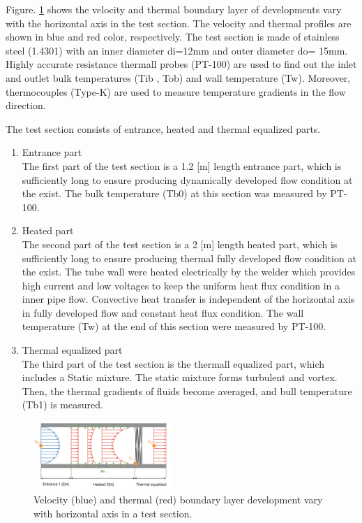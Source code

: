 \documentclass[conference]{IEEEtran}
\begin{document}
Figure. \ref{thermal_boundary_layer_development} shows the velocity and thermal boundary layer of developments vary with the horizontal axis in the test section.
The velocity and thermal profiles are shown in blue and red color, respectively.
The test section is made of stainless steel (1.4301) with an inner diameter di=12mm and outer diameter do= 15mm.
Highly accurate resistance thermall probes (PT-100) are used to find out the inlet and outlet bulk temperatures (Tib , Tob) and wall temperature (Tw).
Moreover, thermocouples (Type-K) are used to measure temperature gradients in the flow direction.

The test section consists of entrance, heated and thermal equalized parts.
\begin{enumerate}
  \item Entrance part\\
  The first part of the test section is a 1.2 [m] length entrance part, which is sufficiently long to ensure producing dynamically developed flow condition at the exist.
  The bulk temperature (Tb0) at this section was measured by PT-100.
  \item Heated part\\
  The second part of the test section is a 2 [m] length heated part, which is sufficiently long to ensure producing thermal fully developed flow condition at the exist.
  The tube wall were heated electrically by the welder which provides high current and low voltages to keep the uniform heat flux condition in a inner pipe flow.
  Convective heat transfer is independent of the horizontal axis in fully developed flow and constant heat flux condition.
  The wall temperature (Tw) at the end of this section were measured by PT-100.
  \item Thermal equalized part\\
  The third part of the test section is the thermall equalized part, which includes a Static mixture.
  The static mixture forms turbulent and vortex.
  Then, the thermal gradients of fluids become averaged, and bull temperature (Tb1) is measured.
\end{enumerate}

\begin{figure}[htbp]
  \centering
\includegraphics[width=0.47\textwidth,natwidth=850,natheight=450]{fig/thermal_boundary_layer_development.png}
  \caption{Velocity (blue) and thermal (red) boundary layer development vary with horizontal axis in a test section.}
  \label{thermal_boundary_layer_development}
\end{figure}
\end{document}
